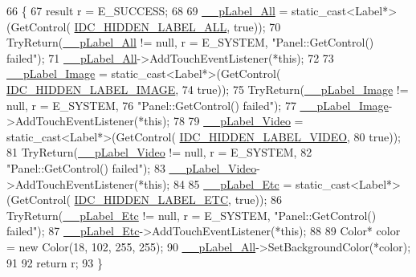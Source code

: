 \begin{DoxyCode}
66                                  \{
67     result r = E\_SUCCESS;
68 
69     \hyperlink{class_browser_tab2_ae52cf0e5fed4756ecf9d4f83a4676ef1}{\_\_pLabel\_All} = \textcolor{keyword}{static\_cast<}Label*\textcolor{keyword}{>}(GetControl(
      \hyperlink{_app_resource_id_8h_ac9397db90c4b3ebfbf6bc3e6055353c1}{IDC\_HIDDEN\_LABEL\_ALL}, \textcolor{keyword}{true}));
70     TryReturn(\hyperlink{class_browser_tab2_ae52cf0e5fed4756ecf9d4f83a4676ef1}{\_\_pLabel\_All} != null, r = E\_SYSTEM, \textcolor{stringliteral}{"Panel::GetControl() failed"});
71     \hyperlink{class_browser_tab2_ae52cf0e5fed4756ecf9d4f83a4676ef1}{\_\_pLabel\_All}->AddTouchEventListener(*\textcolor{keyword}{this});
72 
73     \hyperlink{class_browser_tab2_abb8202996c81f3ac04d4ea2fd9f168a7}{\_\_pLabel\_Image} = \textcolor{keyword}{static\_cast<}Label*\textcolor{keyword}{>}(GetControl(
      \hyperlink{_app_resource_id_8h_a4fb4fc3d07851dac24fca9b4a9e0e27c}{IDC\_HIDDEN\_LABEL\_IMAGE},
74             \textcolor{keyword}{true}));
75     TryReturn(\hyperlink{class_browser_tab2_abb8202996c81f3ac04d4ea2fd9f168a7}{\_\_pLabel\_Image} != null, r = E\_SYSTEM,
76             \textcolor{stringliteral}{"Panel::GetControl() failed"});
77     \hyperlink{class_browser_tab2_abb8202996c81f3ac04d4ea2fd9f168a7}{\_\_pLabel\_Image}->AddTouchEventListener(*\textcolor{keyword}{this});
78 
79     \hyperlink{class_browser_tab2_a7768e46f5a505aaa85e5ce199df7c8fc}{\_\_pLabel\_Video} = \textcolor{keyword}{static\_cast<}Label*\textcolor{keyword}{>}(GetControl(
      \hyperlink{_app_resource_id_8h_a5d02d110c2460802d5caa7d968cd8bbc}{IDC\_HIDDEN\_LABEL\_VIDEO},
80             \textcolor{keyword}{true}));
81     TryReturn(\hyperlink{class_browser_tab2_a7768e46f5a505aaa85e5ce199df7c8fc}{\_\_pLabel\_Video} != null, r = E\_SYSTEM,
82             \textcolor{stringliteral}{"Panel::GetControl() failed"});
83     \hyperlink{class_browser_tab2_a7768e46f5a505aaa85e5ce199df7c8fc}{\_\_pLabel\_Video}->AddTouchEventListener(*\textcolor{keyword}{this});
84 
85     \hyperlink{class_browser_tab2_a108831e016d3f9f353d885156029d1d4}{\_\_pLabel\_Etc} = \textcolor{keyword}{static\_cast<}Label*\textcolor{keyword}{>}(GetControl(
      \hyperlink{_app_resource_id_8h_a6929d8bb1b458e959416cee5c79d316c}{IDC\_HIDDEN\_LABEL\_ETC}, \textcolor{keyword}{true}));
86     TryReturn(\hyperlink{class_browser_tab2_a108831e016d3f9f353d885156029d1d4}{\_\_pLabel\_Etc} != null, r = E\_SYSTEM, \textcolor{stringliteral}{"Panel::GetControl() failed"});
87     \hyperlink{class_browser_tab2_a108831e016d3f9f353d885156029d1d4}{\_\_pLabel\_Etc}->AddTouchEventListener(*\textcolor{keyword}{this});
88 
89     Color* color = \textcolor{keyword}{new} Color(18, 102, 255, 255);
90     \hyperlink{class_browser_tab2_ae52cf0e5fed4756ecf9d4f83a4676ef1}{\_\_pLabel\_All}->SetBackgroundColor(*color);
91 
92     \textcolor{keywordflow}{return} r;
93 \}
\end{DoxyCode}
